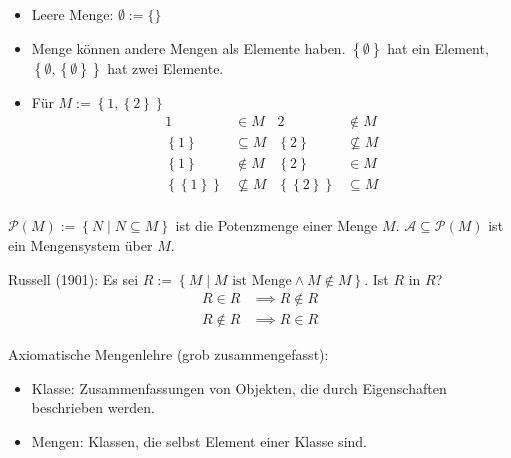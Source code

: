 \begin{remark}
  \begin{itemize}
  \item Leere Menge: $\emptyset := \{\}$\index[sym]{$\emptyset$}
  \item Menge können andere Mengen als Elemente haben. $\left\{ \emptyset \right\}$ hat ein Element, $\left\{ \emptyset, \left\{ \emptyset \right\} \right\}$ hat zwei Elemente.
  \item Für $M:= \left\{ 1, \left\{ 2 \right\} \right\}$
    \begin{align*}
      1 &\in M & 2 &\not\in M \\
      \left\{ 1 \right\} &\subseteq M & \left\{ 2 \right\} &\not\subseteq M \\
      \left\{ 1 \right\} &\not\in M & \left\{ 2 \right\} &\in M \\
      \left\{ \left\{ 1 \right\} \right\} &\not\subseteq M & \left\{ \left\{ 2 \right\} \right\} &\subseteq M \\
    \end{align*}
  \end{itemize}
\end{remark}

\begin{definition}[Potenzmenge]
  $\mathscr{P}(M) := \left\{ N \middle| N \subseteq M \right\}$ ist die Potenzmenge einer Menge $M$. $\mathscr{A} \subseteq \mathscr{P}(M)$ ist ein Mengensystem über $M$.
\end{definition}

\begin{remark}
Russell (1901): Es sei $R := \left\{ M \middle| M \text{ ist Menge} \wedge M \not\in M \right\}$. Ist $R$ in $R$?
\begin{align*}
  R \in R &\implies R \not\in R \\
  R \not\in R &\implies R \in R
\end{align*}

Axiomatische Mengenlehre (grob zusammengefasst):
\begin{itemize}
\item Klasse: Zusammenfassungen von Objekten, die durch Eigenschaften beschrieben werden.
\item Mengen: Klassen, die selbst Element einer Klasse sind.
\end{itemize}
\end{remark}

